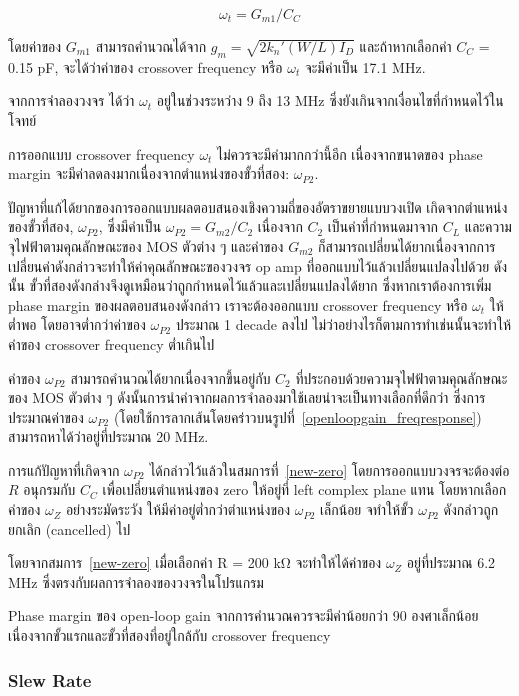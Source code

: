 \documentclass[a4paper, 11pt, oneside]{book} %
\begin{document}
$$\omega_t = G_{m1}/C_C$$

โดยค่าของ $G_{m1}$ สามารถคำนวณได้จาก $g_{m} = \sqrt{2k_n'(W/L)I_D}$ และถ้าหากเลือกค่า $C_C$ = 0.15 pF, จะได้ว่าค่าของ crossover frequency หรือ $\omega_t$ จะมีค่าเป็น 17.1 MHz.

จากการจำลองวงจร ได้ว่า $\omega_t$ อยู่ในช่วงระหว่าง 9 ถึง 13 MHz ซึ่งยังเกินจากเงื่อนไขที่กำหนดไว้ในโจทย์

การออกแบบ crossover frequency $\omega_t$ ไม่ควรจะมีค่ามากกว่านี้อีก เนื่องจากขนาดของ phase margin จะมีค่าลดลงมากเนื่องจากตำแหน่งของขั้วที่สอง: $\omega_{P2}$. 

ปัญหาที่แก้ได้ยากของการออกแบบผลตอบสนองเชิงความถี่ของอัตราขยายแบบวงเปิด เกิดจากตำแหน่งของขั้วที่สอง, $\omega_{P2}$, ซึ่งมีค่าเป็น $\omega_{P2} = G_{m2}/C_2$ เนื่องจาก $C_2$ เป็นค่าที่กำหนดมาจาก $C_L$ และความจุไฟฟ้าตามคุณลักษณะของ MOS ตัวต่าง ๆ และค่าของ $G_{m2}$ ก็สามารถเปลี่ยนได้ยากเนื่องจากการเปลี่ยนค่าดังกล่าวจะทำให้ค่าคุณลักษณะของวงจร op amp ที่ออกแบบไว้แล้วเปลี่ยนแปลงไปด้วย ดังนั้น ขั้วที่สองดังกล่างจึงดูเหมือนว่าถูกกำหนดไว้แล้วและเปลี่ยนแปลงได้ยาก ซึ่งหากเราต้องการเพิ่ม phase margin ของผลตอบสนองดังกล่าว เราจะต้องออกแบบ crossover frequency หรือ $\omega_t$ ให้ต่ำพอ โดยอาจต่ำกว่าค่าของ $\omega_{P2}$ ประมาณ 1 decade ลงไป ไม่ว่าอย่างไรก็ตามการทำเช่นนั้นจะทำให้ค่าของ crossover frequency ต่ำเกินไป

ค่าของ $\omega_{P2}$ สามารถคำนวณได้ยากเนื่องจากขึ้นอยู่กับ $C_2$ ที่ประกอบด้วยความจุไฟฟ้าตามคุณลักษณะของ MOS ตัวต่าง ๆ ดังนั้นการนำค่าจากผลการจำลองมาใช้เลยน่าจะเป็นทางเลือกที่ดีกว่า ซึ่งการประมาณค่าของ $\omega_{P2}$ (โดยใช้การลากเส้นโดยคร่าวบนรูปที่~\ref{openloopgain_freqresponse}) สามารถหาได้ว่าอยู่ที่ประมาณ 20 MHz.

การแก้ปัญหาที่เกิดจาก $\omega_{P2}$ ได้กล่าวไว้แล้วในสมการที่~\ref{new-zero} โดยการออกแบบวงจรจะต้องต่อ $R$ อนุกรมกับ $C_C$ เพื่อเปลี่ยนตำแหน่งของ zero ให้อยู่ที่ left complex plane แทน โดยหากเลือกค่าของ $\omega_{Z}$ อย่างระมัดระวัง ให้มีค่าอยู่ต่ำกว่าตำแหน่งของ $\omega_{P2}$ เล็กน้อย จทำให้ขั้ว $\omega_{P2}$ ดังกล่าวถูกยกเลิก (cancelled) ไป 

โดยจากสมการ~\ref{new-zero} เมื่อเลือกค่า R = 200 \si{\kilo\ohm} จะทำให้ได้ค่าของ $\omega_{Z}$ อยู่ที่ประมาณ 6.2 MHz ซึ่งตรงกับผลการจำลองของวงจรในโปรแกรม

Phase margin ของ open-loop gain จากการคำนวณควรจะมีค่าน้อยกว่า 90 องศาเล็กน้อย เนื่องจากขั้วแรกและขั้วที่สองที่อยู่ใกล้กับ crossover frequency

\subsubsection{Slew Rate}
\end{document}
